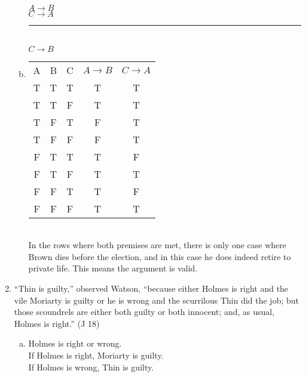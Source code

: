 \documentclass{article}
\begin{document}
\begin{enumerate}
\begin{enumerate}[(a)]
                        $A \to B$\\
                        $C \to A$\\
                        \rule{5em}{.5pt}\\
                        $C \to B$
                  \item
                        \begin{tabular}{c|c|c|c|c}
                              A                      & B & C & $A \to B$ & $C \to A$ \\
                              T                      & T & T & T         & T         \\
                              T                      & T & F & T         & T         \\
                              \rowcolor{lightgray} T & F & T & F         & T         \\
                              \rowcolor{lightgray} T & F & F & F         & T         \\
                              \rowcolor{lightgray} F & T & T & T         & F         \\
                              F                      & T & F & T         & T         \\
                              \rowcolor{lightgray} F & F & T & T         & F         \\
                              F                      & F & F & T         & T         \\
                        \end{tabular} \\ In the rows where both premises are met, there is only one case where Brown dies before the election, and in this case he does indeed retire to private life. This means the argument is valid.
            \end{enumerate}
      \item “Thin is guilty,” observed Watson, “because either Holmes is right and the vile Moriarty is guilty or he is wrong and the scurrilous Thin did the job; but those scoundrels are either both guilty or both innocent; and, as usual, Holmes is right.” (J 18)
            \begin{enumerate}[(a)]
                  \item Holmes is right or wrong.\\
                        If Holmes is right, Moriarty is guilty.\\
                        If Holmes is wrong, Thin is guilty.\\

\end{enumerate}
\end{enumerate}
\end{document}
